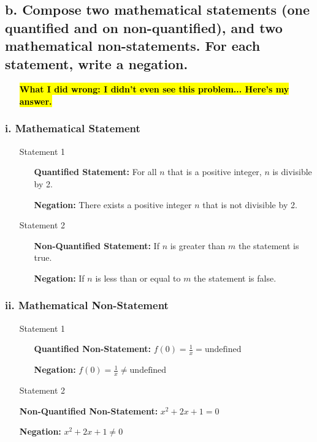\documentclass{article}
\begin{document}
\subsection*{b. Compose two mathematical statements (one quantified and on non-quantified), and 
two mathematical non-statements. For each statement, write a negation.}
\begin{itemize}
    \item[] \hl{\textbf{What I did wrong: I didn't even see this problem... Here's my answer.}}\
\end{itemize}
\subsubsection*{i. Mathematical Statement}
 \begin{itemize}
    \item[Statement 1]
    \begin{itemize}
     \item[] \textbf{Quantified Statement: } For all $n$ that is a positive integer, $n$ is divisible by 2.
     \item[] \textbf{Negation: } There exists a positive integer $n$ that is not divisible by 2.
     \end{itemize}
    \item[Statement 2]
    \begin{itemize}
     \item[] \textbf{Non-Quantified Statement: } If $n$ is greater than $m$ the statement is true.
     \item[] \textbf{Negation: } If $n$ is less than or equal to $m$ the statement is false.
    \end{itemize}
\end{itemize}
\subsubsection*{ii. Mathematical Non-Statement}
\begin{itemize}
    \item[Statement 1]
    \begin{itemize}
     \item[] \textbf{Quantified Non-Statement: } $f(0) = \frac{1}{x} = \text{undefined}$ 
     \item[] \textbf{Negation: } $f(0) = \frac{1}{x} \neq \text{undefined}$
    \end{itemize}
    \item[Statement 2]
    \item[] \textbf{Non-Quantified Non-Statement: } $x^2 + 2x + 1 = 0$
    \item[] \textbf{Negation: } $x^2 + 2x + 1 \neq 0$
    \end{itemize}
    \newpage
\end{document}
